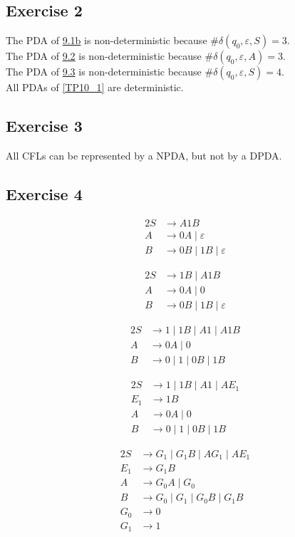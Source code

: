 {\subsection{Exercise 2}
The PDA of \hyperref[TP09_1b]{9.1b} is non-deterministic because $\#\delta(q_0,\varepsilon,S)=3$.\\
The PDA of \hyperref[TP09_2]{9.2} is non-deterministic because $\#\delta(q_0,\varepsilon,A)=3$.\\
The PDA of \hyperref[TP09_3]{9.3} is non-deterministic because $\#\delta (q_0,\varepsilon, S)=4$.\\
All PDAs of \ref{TP10_1} are deterministic.
\subsection{Exercise 3}
All CFLs can be represented by a NPDA, but not by a DPDA.
\subsection{Exercise 4}
\begin{minipage}[c]{0.25\textwidth} \begin{alignat*}{2}
	S &\rightarrow A1B \\
	A &\rightarrow 0A\mid \varepsilon\\
	B &\rightarrow 0B\mid 1B\mid \varepsilon
\end{alignat*} \end{minipage}%
\begin{minipage}[c]{0.25\textwidth} \begin{alignat*}{2}
	S &\rightarrow 1B\mid A1B \\
	A &\rightarrow 0A\mid 0\\
	B &\rightarrow 0B\mid 1B\mid \varepsilon
\end{alignat*} \end{minipage}%
\begin{minipage}[c]{0.25\textwidth} \begin{alignat*}{2}
	S &\rightarrow 1\mid 1B\mid A1\mid A1B \\
	A &\rightarrow 0A\mid 0\\
	B &\rightarrow 0\mid 1\mid 0B\mid 1B
\end{alignat*} \end{minipage}%
\begin{minipage}[c]{0.25\textwidth} \begin{alignat*}{2}
	S &\rightarrow 1\mid 1B\mid A1\mid AE_1 \\
	E_1 &\rightarrow 1B\\
	A &\rightarrow 0A\mid 0\\
	B &\rightarrow 0\mid 1\mid 0B\mid 1B
\end{alignat*} \end{minipage}
\begin{alignat*}{2}
	S &\rightarrow G_1\mid G_1B\mid AG_1\mid AE_1 \\
	E_1 &\rightarrow G_1B\\
	A &\rightarrow G_0A\mid G_0\\
	B &\rightarrow G_0\mid G_1\mid G_0B\mid G_1B\\
	G_0 &\rightarrow 0\\
	G_1 &\rightarrow 1
\end{alignat*}
}
